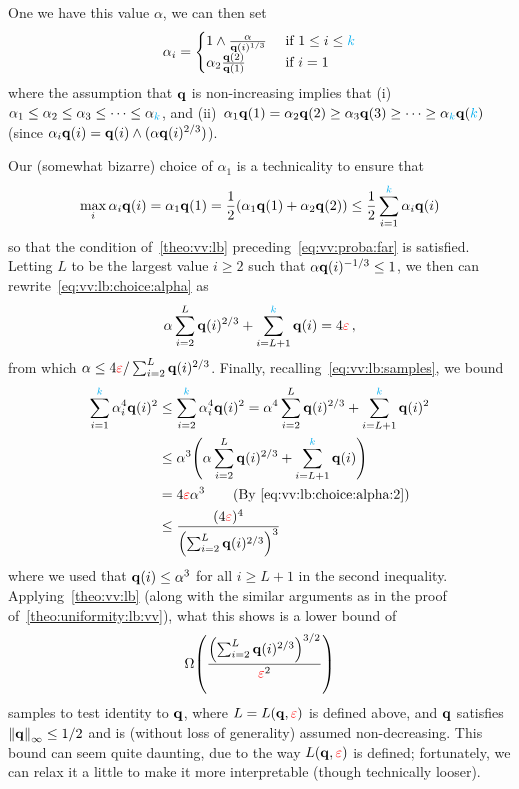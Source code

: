 One we have this value $\alpha$, we can then set
\begin{equation}
	\label{eq:vv:lb:choice:alphai}
	\alpha_i =
	\begin{cases}
		1\land \frac{\alpha}{\mathbf{q}(i)^{1/3}} &\text{ if } 1\leq i\leq {\textcolor{cyan}{k}}\\
		\alpha_2\frac{\mathbf{q}(2)}{\mathbf{q}(1)} &\text{ if } i =1
	\end{cases}
\end{equation}
where the assumption that $\mathbf{q}$ is non-increasing implies that (i)~$\alpha_1\leq\alpha_2\leq \alpha_3\leq \dots \leq \alpha_{\textcolor{cyan}{k}}$, and (ii)~$\alpha_1\mathbf{q}(1)=\alpha_2\mathbf{q}(2)\geq \alpha_3\mathbf{q}(3)\geq \dots \geq \alpha_{\textcolor{cyan}{k}}\mathbf{q}({\textcolor{cyan}{k}})$ (since $\alpha_i\mathbf{q}(i) = \mathbf{q}(i)\land (\alpha\mathbf{q}(i)^{2/3})$).

\noindent Our (somewhat bizarre) choice of $\alpha_1$ is a technicality to ensure that
\[
	\max_i \alpha_i\mathbf{q}(i) = \alpha_1\mathbf{q}(1) = \frac{1}{2}(\alpha_1\mathbf{q}(1)+\alpha_2\mathbf{q}(2)) \leq \frac{1}{2}\sum_{i=1}^{\textcolor{cyan}{k}} \alpha_i\mathbf{q}(i)
\]
so that the condition of~\cref{theo:vv:lb} preceding~\cref{eq:vv:proba:far} is satisfied. Letting $L$ to be the largest value $i\geq 2$ such that $\alpha\mathbf{q}(i)^{-1/3} \leq 1$, we then can rewrite~\cref{eq:vv:lb:choice:alpha} as
\begin{equation}
	\label{eq:vv:lb:choice:alpha:2}
	\alpha\sum_{i=2}^L \mathbf{q}(i)^{2/3} + \sum_{i=L+1}^{\textcolor{cyan}{k}} \mathbf{q}(i) = 4\textcolor{red}{\varepsilon}\,,
\end{equation}
from which $\alpha \leq 4\textcolor{red}{\varepsilon}/\sum_{i=2}^L \mathbf{q}(i)^{2/3}$. Finally, recalling~\cref{eq:vv:lb:samples}, we bound
\begin{align}
	\sum_{i=1}^\ab \alpha_i^4\q(i)^2
	&\leq \sum_{i=2}^\ab \alpha_i^4\q(i)^2
	= \alpha^4\sum_{i=2}^L \q(i)^{2/3} + \sum_{i=L+1}^\ab \q(i)^2 \notag\\
	&\leq \alpha^3\Paren{\alpha\sum_{i=2}^L \q(i)^{2/3} + \sum_{i=L+1}^\ab \q(i) } \notag\\
	&= 4\dst \alpha^3 \tag{By~\cref{eq:vv:lb:choice:alpha:2}}\\
	&\leq \frac{(4\dst)^4}{\Paren{\sum_{i=2}^L \q(i)^{2/3}}^3}
\end{align}
where we used that $\mathbf{q}(i) \leq \alpha^3$ for all $i \geq L+1$ in the second inequality. Applying~\cref{theo:vv:lb} (along with the similar arguments as in the proof of~\cref{theo:uniformity:lb:vv}), what this shows is a lower bound of
\begin{equation}
	\label{eq:vv:lb:complicated}
	\bigOmega{ \frac{\Paren{\sum_{i=2}^L \q(i)^{2/3}}^{3/2}}{\dst^2}}
\end{equation}
samples to test identity to $\mathbf{q}$, where $L=L(\mathbf{q},\textcolor{red}{\varepsilon})$ is defined above, and $\mathbf{q}$ satisfies $\norminf{\q}\leq 1/2$ and is (without loss of generality) assumed non-decreasing. This bound can seem quite daunting, due to the way $L(\mathbf{q},\textcolor{red}{\varepsilon})$ is defined; fortunately, we can relax it a little to make it more interpretable (though technically looser). 

